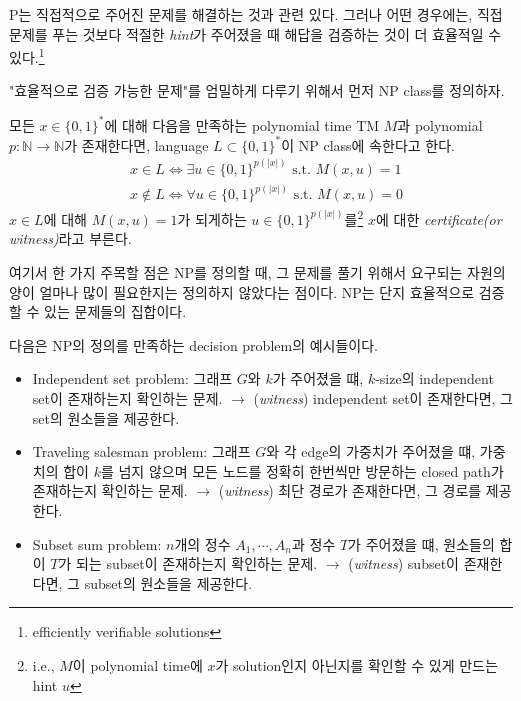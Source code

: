 P는 직접적으로 주어진 문제를 해결하는 것과 관련 있다. 그러나 어떤 경우에는, 직접 문제를 푸는 것보다 적절한 \textit{hint}가 주어졌을 때 해답을 검증하는 것이 더 효율적일 수 있다.\footnote{efficiently verifiable solutions} 

"효율적으로 검증 가능한 문제"를 엄밀하게 다루기 위해서 먼저 NP class를 정의하자.
\begin{definition}\label{def:NP-class}
    모든 $x \in \{0, 1\}^*$에 대해 다음을 만족하는 polynomial time TM $M$과 polynomial $p: \mathbb N \rightarrow \mathbb N$가 존재한다면, language $L \subset \{0, 1\}^*$이 NP class에 속한다고 한다.
    $$ \begin{aligned}
        & x \in L \Longleftrightarrow \exists u \in\{0,1\}^{p(|x|)} \text { s.t. } M(x, u)=1 \\
        & x \notin L \Longleftrightarrow \forall u \in\{0,1\}^{p(|x|)} \text { s.t. } M(x, u)=0
    \end{aligned} $$
    $x \in L $에 대해 $M(x, u)=1$가 되게하는 $u \in\{0,1\}^{p(|x|)}$를\footnote{i.e., $M$이 polynomial time에 $x$가 solution인지 아닌지를 확인할 수 있게 만드는 hint $u$} $x$에 대한 \textit{certificate(or witness)}라고 부른다.
\end{definition}

여기서 한 가지 주목할 점은 NP를 정의할 때, 그 문제를 풀기 위해서 요구되는 자원의 양이 얼마나 많이 필요한지는 정의하지 않았다는 점이다. NP는 단지 효율적으로 검증할 수 있는 문제들의 집합이다.

\vspace{1em}

다음은 NP의 정의를 만족하는 decision problem의 예시들이다.
\begin{itemize}
    \item Independent set problem: 그래프 $G$와 $k$가 주어졌을 떄, $k$-size의 independent set이 존재하는지 확인하는 문제. $\rightarrow$ (\textit{witness}) independent set이 존재한다면, 그 set의 원소들을 제공한다.
    \item Traveling salesman problem: 그래프 $G$와 각 edge의 가중치가 주어졌을 떄, 가중치의 합이 $k$를 넘지 않으며 모든 노드를 정확히 한번씩만 방문하는 closed path가 존재하는지 확인하는 문제. $\rightarrow$ (\textit{witness}) 최단 경로가 존재한다면, 그 경로를 제공한다.
    \item Subset sum problem: $n$개의 정수 $A_1, \cdots, A_n$과 정수 $T$가 주어졌을 떄, 원소들의 합이 $T$가 되는 subset이 존재하는지 확인하는 문제. $\rightarrow$ (\textit{witness}) subset이 존재한다면, 그 subset의 원소들을 제공한다.
\end{itemize}

